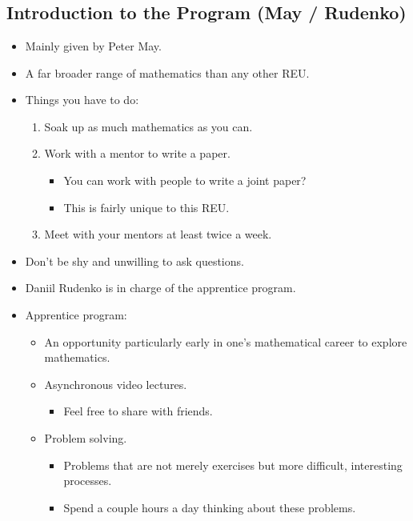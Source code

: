 \documentclass[../apprentice.tex]{subfiles}
\begin{document}
\chapter{}
\section{Introduction to the Program (May / Rudenko)}
\begin{itemize}
    \item {}Mainly given by Peter May.
    \item A far broader range of mathematics than any other REU.
    \item Things you have to do:
    \begin{enumerate}
        \item Soak up as much mathematics as you can.
        \item Work with a mentor to write a paper.
        \begin{itemize}
            \item You can work with people to write a joint paper?
            \item This is fairly unique to this REU.
        \end{itemize}
        \item Meet with your mentors at least twice a week.
    \end{enumerate}
    \item Don't be shy and unwilling to ask questions.
    \item Daniil Rudenko is in charge of the apprentice program.
    \item Apprentice program:
    \begin{itemize}
        \item An opportunity particularly early in one's mathematical career to explore mathematics.
        \item Asynchronous video lectures.
        \begin{itemize}
            \item Feel free to share with friends.
        \end{itemize}
        \item Problem solving.
        \begin{itemize}
            \item Problems that are not merely exercises but more difficult, interesting processes.
            \item Spend a couple hours a day thinking about these problems.

\end{itemize}
\end{itemize}
\end{itemize}
\end{document}

